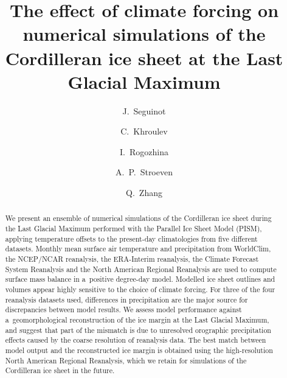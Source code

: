 \documentclass[tc, ms]{copernicus}
\begin{document}
\hack{\sloppy}

\title{The effect of climate forcing on numerical simulations of the Cordilleran ice sheet at the Last Glacial Maximum}

\author[1]{J.~Seguinot}
\author[2]{C.~Khroulev}
\author[3]{I.~Rogozhina}
\author[1]{A.~P.~Stroeven}
\author[1]{Q.~Zhang}


\received{}
\pubdiscuss{}
\revised{}
\accepted{}
\published{}

\maketitle

\begin{abstract}
We present an ensemble of numerical simulations of the Cordilleran ice sheet during the Last Glacial Maximum performed with the Parallel Ice Sheet Model (PISM), applying temperature offsets to the present-day climatologies from five different datasets. Monthly mean surface air temperature and precipitation from WorldClim, the NCEP/NCAR reanalysis, the ERA-Interim reanalysis, the Climate Forecast System Reanalysis and the North American Regional Reanalysis are used to compute surface mass balance in a~positive degree-day model. Modelled ice sheet outlines and volumes appear highly sensitive to the choice of climate forcing. For three of the four reanalysis datasets used, differences in precipitation are the major source for discrepancies between model results. We assess model performance against a~geomorphological reconstruction of the ice margin at the Last Glacial Maximum, and suggest that part of the mismatch is due to unresolved orographic precipitation effects caused by the coarse resolution of reanalysis data. The best match between model output and the reconstructed ice margin is obtained using the high-resolution North American Regional Reanalysis, which we retain for simulations of the Cordilleran ice sheet in the future.
\end{abstract}
\end{document}

